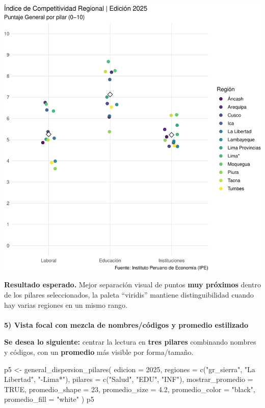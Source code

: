 \documentclass[
  11pt,
  letterpaper,
  DIV=11,
  numbers=noendperiod]{scrartcl}
\makeatletter
\let\oldparagraph\paragraph
\renewcommand{\paragraph}{
    \@ifstar
      \xxxParagraphStar
      \xxxParagraphNoStar
  }
\newcommand{\xxxParagraphStar}[1]{\oldparagraph*{#1}\mbox{}}
\newcommand{\xxxParagraphNoStar}[1]{\oldparagraph{#1}\mbox{}}
\newenvironment{Shaded}{\begin{snugshade}}{\end{snugshade}}
\newcommand{\AttributeTok}[1]{\textcolor[rgb]{0.40,0.45,0.13}{#1}}
\newcommand{\ConstantTok}[1]{\textcolor[rgb]{0.56,0.35,0.01}{#1}}
\newcommand{\DecValTok}[1]{\textcolor[rgb]{0.68,0.00,0.00}{#1}}
\newcommand{\FloatTok}[1]{\textcolor[rgb]{0.68,0.00,0.00}{#1}}
\newcommand{\FunctionTok}[1]{\textcolor[rgb]{0.28,0.35,0.67}{#1}}
\newcommand{\NormalTok}[1]{\textcolor[rgb]{0.00,0.23,0.31}{#1}}
\newcommand{\OtherTok}[1]{\textcolor[rgb]{0.00,0.23,0.31}{#1}}
\newcommand{\StringTok}[1]{\textcolor[rgb]{0.13,0.47,0.30}{#1}}
\makeatother
\begin{document}
\includegraphics{Manual_files/figure-pdf/unnamed-chunk-24-1.pdf}

\textbf{Resultado esperado.} Mejor separación visual de puntos
\textbf{muy próximos} dentro de los pilares seleccionados, la paleta
``viridis'' mantiene distinguibilidad cuando hay varias regiones en un
mismo rango.

\paragraph{\texorpdfstring{\textbf{5) Vista focal con mezcla de
nombres/códigos y promedio
estilizado}}{5) Vista focal con mezcla de nombres/códigos y promedio estilizado}}\label{vista-focal-con-mezcla-de-nombrescuxf3digos-y-promedio-estilizado}

\textbf{Se desea lo siguiente:} centrar la lectura en \textbf{tres
pilares} combinando nombres y códigos, con un \textbf{promedio} más
visible por forma/tamaño.

\begin{Shaded}
\begin{Highlighting}[]
\NormalTok{p5 }\OtherTok{\textless{}{-}} \FunctionTok{general\_dispersion\_pilares}\NormalTok{(}
  \AttributeTok{edicion =} \DecValTok{2025}\NormalTok{,}
  \AttributeTok{regiones =} \FunctionTok{c}\NormalTok{(}\StringTok{"gr\_sierra"}\NormalTok{, }\StringTok{"La Libertad"}\NormalTok{, }\StringTok{"{-}Lima*"}\NormalTok{),}
  \AttributeTok{pilares  =} \FunctionTok{c}\NormalTok{(}\StringTok{"Salud"}\NormalTok{, }\StringTok{"EDU"}\NormalTok{, }\StringTok{"INF"}\NormalTok{),}
  \AttributeTok{mostrar\_promedio =} \ConstantTok{TRUE}\NormalTok{,}
  \AttributeTok{promedio\_shape =} \DecValTok{23}\NormalTok{,}
  \AttributeTok{promedio\_size  =} \FloatTok{4.2}\NormalTok{,}
  \AttributeTok{promedio\_color =} \StringTok{"black"}\NormalTok{,}
  \AttributeTok{promedio\_fill  =} \StringTok{"white"}
\NormalTok{)}
\NormalTok{p5}
\end{Highlighting}
\end{Shaded}
\end{document}
